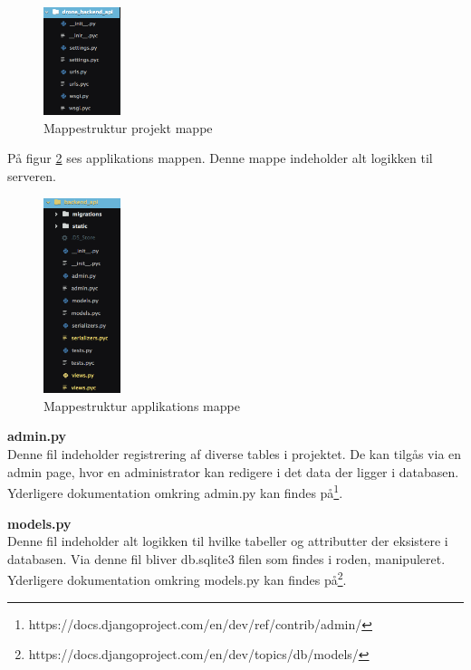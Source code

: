 \begin{figure}[H]
	\centering
	\includegraphics[width=0.2\textwidth]{Billeder/implementation/mappestruktur_2.png}
	\caption{Mappestruktur projekt mappe}
	\label{fig:mappestruktur_2}
\end{figure}

\newpage

På figur \ref{fig:mappestruktur_3} ses applikations mappen. Denne mappe indeholder alt logikken til serveren.

\begin{figure}[H]
	\centering
	\includegraphics[width=0.2\textwidth]{Billeder/implementation/mappestruktur_3.png}
	\caption{Mappestruktur applikations mappe}
	\label{fig:mappestruktur_3}
\end{figure}

\textbf{admin.py} \\
Denne fil indeholder registrering af diverse tables i projektet. De kan tilgås via en admin page, hvor en administrator kan redigere i det data der ligger i databasen. Yderligere dokumentation omkring admin.py kan findes på\footnote{https://docs.djangoproject.com/en/dev/ref/contrib/admin/}.

\textbf{models.py} \\
Denne fil indeholder alt logikken til hvilke tabeller og attributter der eksistere i databasen. Via denne fil bliver db.sqlite3 filen som findes i roden, manipuleret. Yderligere dokumentation omkring models.py kan findes på\footnote{https://docs.djangoproject.com/en/dev/topics/db/models/}.

